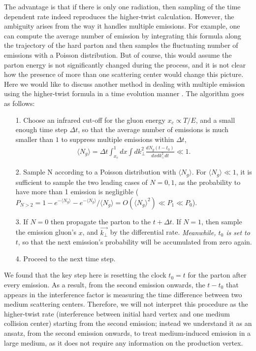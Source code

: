 The advantage is that if there is only one radiation, then sampling of the time dependent rate indeed reproduces the higher-twist calculation.
However, the ambiguity arises from the way it handles multiple emissions.
For example, one can compute the average number of emission by integrating this formula along the trajectory of the hard parton and then samples the fluctuating number of emissions with a Poisson distribution.
But of course, this would assume the parton energy is not significantly changed during the process, and it is not clear how the presence of more than one scattering center would change this picture.
Here we would like to discuss another method in dealing with multiple emission using the higher-twist formula in a time evolution manner \cite{Cao:2013ita}.
The algorithm goes as follows:
\begin{itemize}
\item[1.] Choose an infrared cut-off for the gluon energy $x_c \propto T/E$, and a small enough time step $\Delta t$, so that the average number of emissions is much smaller than $1$ to suppress multiple emissions within $\Delta t$,
\begin{eqnarray}
\langle N_g \rangle = \Delta t \int_{x_c}^1 dx \int dk_\perp^2 \frac{dN_g(t-t_0)}{dx dk_\perp^2 dt} \ll 1.
\end{eqnarray}
\item[2.] Sample N according to a Poisson distribution with $\langle N_g \rangle$. For $\langle N_g \rangle \ll 1$, it is sufficient to sample the two leading cases of $N=0, 1$, as the probability to have more than 1 emission is negligible ($P_{N>2} = 1-e^{-\langle N_g \rangle}-e^{-\langle N_g \rangle}/\langle N_g \rangle = O(\langle N_g \rangle^2) \ll P_1 \ll P_0$).
\item[3.] If $N=0$ then propagate the parton to the $t+\Delta t$. If $N=1$, then sample the emission gluon's $x$, and $\vec{k_\perp}$ by the differential rate. {\it Meanwhile, $t_0$ is set to $t$}, so that the next emission's probability will be accumulated from zero again.
\item[4.] Proceed to the next time step.
\end{itemize}
We found that the key step here is resetting the clock $t_0 = t$ for the parton after every emission.
As a result, from the second emission onwards, the $t-t_0$ that appears in the interference factor is measuring the time difference between two medium scattering centers.
Therefore, we will not interpret this procedure as the higher-twist rate (interference between initial hard vertex and one medium collision center) starting from the second emission;
instead we understand it as an ansatz, from the second emission onwards, to treat medium-induced emission in a large medium, as it does not require any information on the production vertex.


